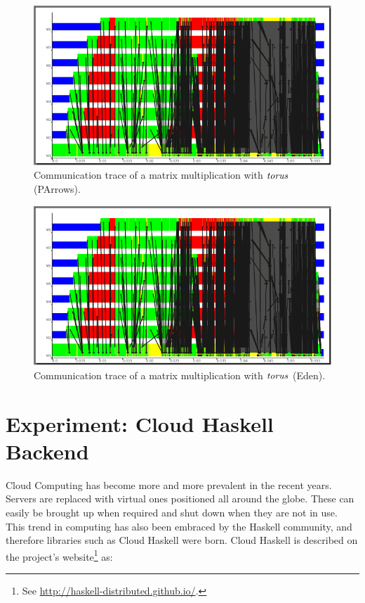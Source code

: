 \documentclass[paper=A4,twoside=true,openright,parskip=full,chapterprefix=true,headings=normal,bibliography=totoc,listof=totoc,titlepage=on,captions=tableabove,draft=false,british]{scrreprt}%
\begin{document}
\begin{figure}[H]
\centering
\includegraphics{src/img/torus_matrix_parrows_trace.pdf}
\caption{Communication trace of a matrix multiplication with \ensuremath{\Varid{torus}}
(PArrows).\label{fig:torus_parrows_trace}}
\end{figure}

\begin{figure}[H]
\centering
\includegraphics{src/img/torus_matrix_parrows_trace.pdf}
\caption{Communication trace of a matrix multiplication with \ensuremath{\Varid{torus}}
(Eden).\label{fig:torus_eden_trace}}
\end{figure}

\hypertarget{experiment-cloud-haskell-backend}{%
\chapter{Experiment: Cloud Haskell
Backend}\label{experiment-cloud-haskell-backend}}

\label{sec:cloudHaskellExperiment}

Cloud Computing has become more and more prevalent in the recent years.
Servers are replaced with virtual ones positioned all around the globe.
These can easily be brought up when required and shut down when they are
not in use. This trend in computing has also been embraced by the
Haskell community, and therefore libraries such as Cloud Haskell were
born. Cloud Haskell is described on the project's website\footnote{See
  \url{http://haskell-distributed.github.io/}.} as:
\end{document}
